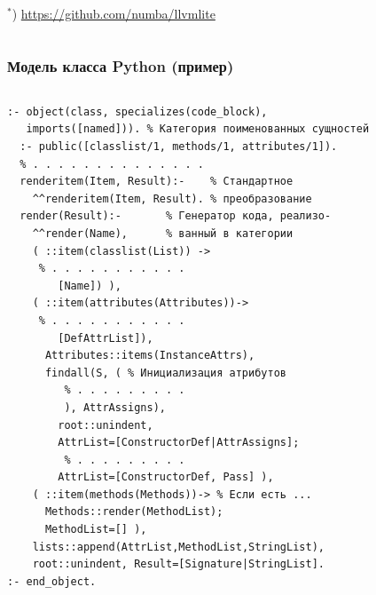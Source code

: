 \documentclass[10pt]{beamer}
\begin{document}
\begin{frame}[fragile]
\begin{columns}
\begin{column}{0.4\textwidth}
  ${}^*$) \url{https://github.com/numba/llvmlite}
    \end{column}
  \end{columns}
\end{frame}

\begin{frame}[fragile]
  \frametitle{Модель класса Python (пример)}
  \begin{columns}
    \begin{column}{0.6\textwidth}
      \flushleft
\begin{verbatim}
:- object(class, specializes(code_block),
   imports([named])). % Категория поименованных сущностей
  :- public([classlist/1, methods/1, attributes/1]).
  % . . . . . . . . . . . . . .
  renderitem(Item, Result):-    % Стандартное
    ^^renderitem(Item, Result). % преобразование
  render(Result):-       % Генератор кода, реализо-
    ^^render(Name),      % ванный в категории
    ( ::item(classlist(List)) ->
     % . . . . . . . . . . .
        [Name]) ),
    ( ::item(attributes(Attributes))->
     % . . . . . . . . . . .
        [DefAttrList]),
      Attributes::items(InstanceAttrs),
      findall(S, ( % Инициализация атрибутов
         % . . . . . . . . .
         ), AttrAssigns),
        root::unindent,
        AttrList=[ConstructorDef|AttrAssigns];
         % . . . . . . . . .
        AttrList=[ConstructorDef, Pass] ),
    ( ::item(methods(Methods))-> % Если есть ...
      Methods::render(MethodList);
      MethodList=[] ),
    lists::append(AttrList,MethodList,StringList),
    root::unindent, Result=[Signature|StringList].
:- end_object.
\end{verbatim}
    \end{column}
    \begin{column}{0.4\linewidth}

\end{column}
\end{columns}
\end{frame}
\end{document}
